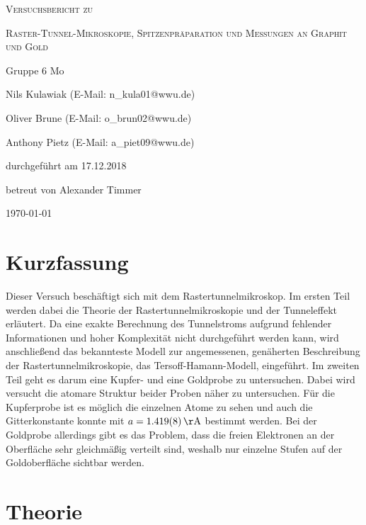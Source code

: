 \documentclass[
	a4paper,
	12pt,
	pagesize,
	ngerman
]{scrartcl}
\begin{document}
\begin{titlepage}
	\centering
	{\scshape\LARGE Versuchsbericht zu \par}
	\vspace{1cm}
	{\scshape\huge Raster-Tunnel-Mikroskopie, Spitzenpräparation und Messungen an Graphit und Gold     \par}
	\vspace{2.5cm}
	{\LARGE Gruppe 6 Mo\par}
	\vspace{0.5cm}
	{\large Nils Kulawiak (E-Mail: n\_kula01@wwu.de) \par}
	{\large Oliver Brune (E-Mail: o\_brun02@wwu.de) \par}
	{\large Anthony Pietz (E-Mail: a\_piet09@wwu.de) \par}
	\vfill
	durchgeführt am 17.12.2018\par
	
	\vfill
	betreut von Alexander Timmer\par
	
	\vfill
	{\large \today\par}
\end{titlepage}

\tableofcontents
		
\newpage
\section{Kurzfassung}
Dieser Versuch beschäftigt sich mit dem Rastertunnelmikroskop. Im ersten Teil werden dabei die Theorie der Rastertunnelmikroskopie und der Tunneleffekt erläutert. Da eine exakte Berechnung des Tunnelstroms aufgrund fehlender Informationen und hoher Komplexität nicht durchgeführt werden kann, wird anschließend das bekannteste Modell zur angemessenen, genäherten Beschreibung der Rastertunnelmikroskopie, das Tersoff-Hamann-Modell, eingeführt. Im zweiten Teil geht es darum eine Kupfer- und eine Goldprobe zu untersuchen. Dabei wird versucht die atomare Struktur beider Proben näher zu untersuchen. Für die Kupferprobe ist es möglich die einzelnen Atome zu sehen und auch die Gitterkonstante konnte mit $a = \SI{1,419 \pm 0,008} {\AA}$ bestimmt werden. Bei der Goldprobe allerdings gibt es das Problem, dass die freien Elektronen an der Oberfläche sehr gleichmäßig verteilt sind, weshalb nur einzelne Stufen auf der Goldoberfläche sichtbar werden. 

\section{Theorie}
\end{document}
